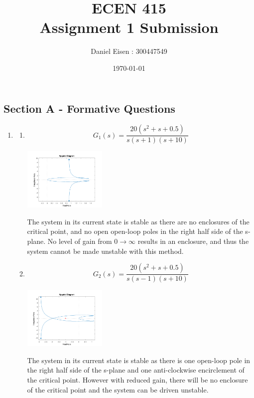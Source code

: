 \documentclass[11pt]{article}
\title{ECEN 415 \\ Assignment 1 Submission}
\author{Daniel Eisen : 300447549}
\date{\today}
\begin{document}
\begin{preview}
\maketitle

\section*{Section A - Formative Questions}
\begin{enumerate}
    \item 
    \begin{enumerate}
        \item 
        $$G_1(s) = \frac{20(s^2 + s + 0.5)}{s(s+1)(s+10)}$$
        \begin{center}
            \includegraphics[width=0.33\textwidth]{fig/1a.png}
        \end{center}
        The system in its current state is stable as there are no enclosures of the critical point, and no open open-loop poles in the right half side of the s-plane. No level of gain from $0 \rightarrow \infty$ results in an enclosure, and thus the system cannot be made unstable with this method.  
        \item 
        $$G_2(s) = \frac{20(s^2 + s + 0.5)}{s(s-1)(s+10)}$$
        \begin{center}
            \includegraphics[width=0.33\textwidth]{fig/1b.png}
        \end{center}
        The system in its current state is stable as there is one open-loop pole in the right half side of the s-plane and one anti-clockwise encirclement of the critical point. However with reduced gain, there will be no enclosure of the critical point and the system can be driven unstable.

\end{enumerate}
\end{enumerate}
\end{preview}
\end{document}
